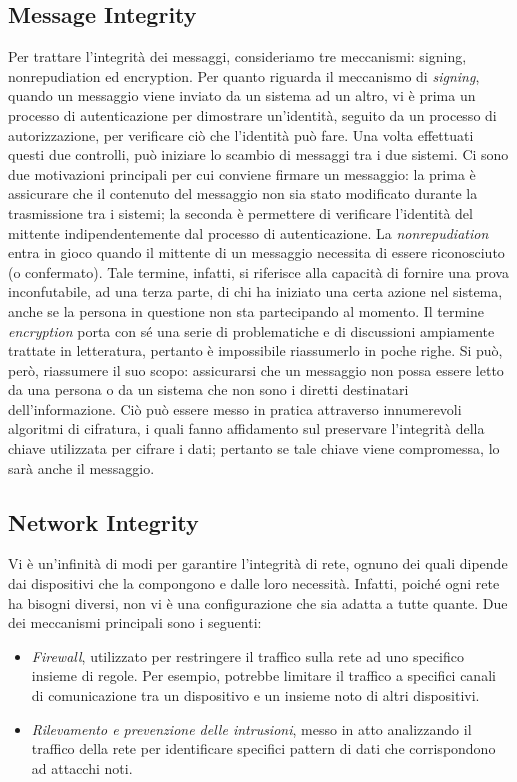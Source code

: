 \subsection{Message Integrity}
Per trattare l'integrità dei messaggi, consideriamo tre meccanismi: signing, nonrepudiation ed encryption. \newline
Per quanto riguarda il meccanismo di \textit{signing}, quando un messaggio viene inviato da un sistema ad un altro, vi è prima un processo di autenticazione per dimostrare un'identità, seguito da un processo di autorizzazione, per verificare ciò che l'identità può fare. Una volta effettuati questi due controlli, può iniziare lo scambio di messaggi tra i due sistemi. Ci sono due motivazioni principali per cui conviene firmare un messaggio: la prima è assicurare che il contenuto del messaggio non sia stato modificato durante la trasmissione tra i sistemi; la seconda è permettere di verificare l'identità del mittente indipendentemente dal processo di autenticazione. \newline
La \textit{nonrepudiation} entra in gioco quando il mittente di un messaggio necessita di essere riconosciuto (o confermato). Tale termine, infatti, si riferisce alla capacità di fornire una prova inconfutabile, ad una terza parte, di chi ha iniziato una certa azione nel sistema, anche se la persona in questione non sta partecipando al momento. \newline
Il termine \textit{encryption} porta con sé una serie di problematiche e di discussioni ampiamente trattate in letteratura, pertanto è impossibile riassumerlo in poche righe. Si può, però, riassumere il suo scopo: assicurarsi che un messaggio non possa essere letto da una persona o da un sistema che non sono i diretti destinatari dell'informazione. Ciò può essere messo in pratica attraverso innumerevoli algoritmi di cifratura, i quali fanno affidamento sul preservare l'integrità della chiave utilizzata per cifrare i dati; pertanto se tale chiave viene compromessa, lo sarà anche il messaggio. 

\subsection{Network Integrity}
Vi è un'infinità di modi per garantire l'integrità di rete, ognuno dei quali dipende dai dispositivi che la compongono e dalle loro necessità. Infatti, poiché ogni rete ha bisogni diversi, non vi è una configurazione che sia adatta a tutte quante.
\newline Due dei meccanismi principali sono i seguenti:
\begin{itemize}
\item \textit{Firewall}, utilizzato per restringere il traffico sulla rete ad uno specifico insieme di regole. Per esempio, potrebbe limitare il traffico a specifici canali di comunicazione tra un dispositivo e un insieme noto di altri dispositivi.
\item \textit{Rilevamento e prevenzione delle intrusioni}, messo in atto analizzando il traffico della rete per identificare specifici pattern di dati che corrispondono ad attacchi noti.
\end{itemize}

